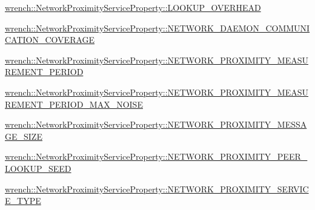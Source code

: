 \begin{DoxyItemize}
\item {\ttfamily \hyperlink{classwrench_1_1_network_proximity_service_property_a180718956b9f9b7bf040cc60dcef65f7}{wrench\+::\+Network\+Proximity\+Service\+Property\+::\+L\+O\+O\+K\+U\+P\+\_\+\+O\+V\+E\+R\+H\+E\+AD}}
\item {\ttfamily \hyperlink{classwrench_1_1_network_proximity_service_property_a19af22a3ba877db9832cd764de95d3d8}{wrench\+::\+Network\+Proximity\+Service\+Property\+::\+N\+E\+T\+W\+O\+R\+K\+\_\+\+D\+A\+E\+M\+O\+N\+\_\+\+C\+O\+M\+M\+U\+N\+I\+C\+A\+T\+I\+O\+N\+\_\+\+C\+O\+V\+E\+R\+A\+GE}}
\item {\ttfamily \hyperlink{classwrench_1_1_network_proximity_service_property_ae186f459f35a78e808d406f74483e418}{wrench\+::\+Network\+Proximity\+Service\+Property\+::\+N\+E\+T\+W\+O\+R\+K\+\_\+\+P\+R\+O\+X\+I\+M\+I\+T\+Y\+\_\+\+M\+E\+A\+S\+U\+R\+E\+M\+E\+N\+T\+\_\+\+P\+E\+R\+I\+OD}}
\item {\ttfamily \hyperlink{classwrench_1_1_network_proximity_service_property_a4a8f7599edf8a3983a0ff5ddfa3c8e2e}{wrench\+::\+Network\+Proximity\+Service\+Property\+::\+N\+E\+T\+W\+O\+R\+K\+\_\+\+P\+R\+O\+X\+I\+M\+I\+T\+Y\+\_\+\+M\+E\+A\+S\+U\+R\+E\+M\+E\+N\+T\+\_\+\+P\+E\+R\+I\+O\+D\+\_\+\+M\+A\+X\+\_\+\+N\+O\+I\+SE}}
\item {\ttfamily \hyperlink{classwrench_1_1_network_proximity_service_property_ad29e681b572ce963991844a75794e4c2}{wrench\+::\+Network\+Proximity\+Service\+Property\+::\+N\+E\+T\+W\+O\+R\+K\+\_\+\+P\+R\+O\+X\+I\+M\+I\+T\+Y\+\_\+\+M\+E\+S\+S\+A\+G\+E\+\_\+\+S\+I\+ZE}}
\item {\ttfamily \hyperlink{classwrench_1_1_network_proximity_service_property_a1c62b6bc5aef9b415d583aff4d44a892}{wrench\+::\+Network\+Proximity\+Service\+Property\+::\+N\+E\+T\+W\+O\+R\+K\+\_\+\+P\+R\+O\+X\+I\+M\+I\+T\+Y\+\_\+\+P\+E\+E\+R\+\_\+\+L\+O\+O\+K\+U\+P\+\_\+\+S\+E\+ED}}
\item {\ttfamily \hyperlink{classwrench_1_1_network_proximity_service_property_a4cb766dcd609012ab68000cfd9dc11b1}{wrench\+::\+Network\+Proximity\+Service\+Property\+::\+N\+E\+T\+W\+O\+R\+K\+\_\+\+P\+R\+O\+X\+I\+M\+I\+T\+Y\+\_\+\+S\+E\+R\+V\+I\+C\+E\+\_\+\+T\+Y\+PE}} 
\end{DoxyItemize}
